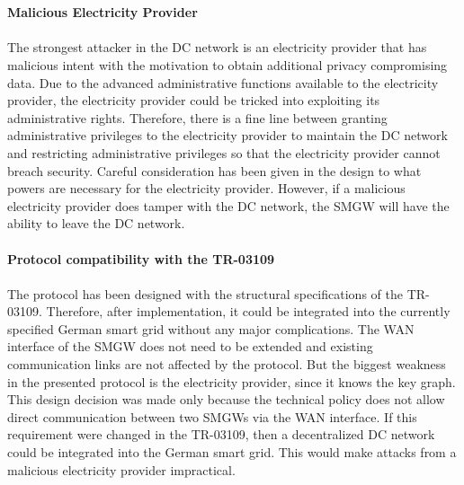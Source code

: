 \\
\\
\textbf{Malicious Electricity Provider}
\\
\\
The strongest attacker in the DC network is an electricity provider that has malicious intent with the motivation to obtain additional privacy compromising data. Due to the advanced administrative functions available to the electricity provider, the electricity provider could be tricked into exploiting its administrative rights. Therefore, there is a fine line between granting administrative privileges to the electricity provider to maintain the DC network and restricting administrative privileges so that the electricity provider cannot breach security. Careful consideration has been given in the design to what powers are necessary for the electricity provider. However, if a malicious electricity provider does tamper with the DC network, the \gls{SMGW} will have the ability to leave the DC network.
\\
\\
\textbf{Protocol compatibility with the TR-03109}
\\
\\
The protocol has been designed with the structural specifications of the \gls{TR-03109}. Therefore, after implementation, it could be integrated into the currently specified German smart grid without any major complications. The \gls{WAN} interface of the \gls{SMGW} does not need to be extended and existing communication links are not affected by the protocol. 
But the biggest weakness in the presented protocol is the electricity provider, since it knows the key graph. This design decision was made only because the technical policy does not allow direct communication between two \gls{SMGW}s via the \gls{WAN} interface. If this requirement were changed in the \gls{TR-03109}, then a decentralized DC network could be integrated into the German smart grid. This would make attacks from a malicious electricity provider impractical.

\clearpage





